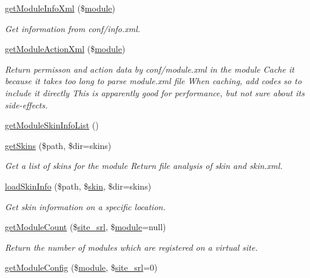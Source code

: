 \begin{DoxyCompactItemize}
\hyperlink{classmoduleModel_ae4e9287674bddc605dfc4cef77f8c1bb}{get\+Module\+Info\+Xml} (\$\hyperlink{classmodule}{module})
\begin{DoxyCompactList}\small\item\em Get information from conf/info.\+xml. \end{DoxyCompactList}\item 
\hyperlink{classmoduleModel_a2d53da77f2504357f99b93a2ad09981a}{get\+Module\+Action\+Xml} (\$\hyperlink{classmodule}{module})
\begin{DoxyCompactList}\small\item\em Return permisson and action data by conf/module.\+xml in the module Cache it because it takes too long to parse module.\+xml file When caching, add codes so to include it directly This is apparently good for performance, but not sure about its side-\/effects. \end{DoxyCompactList}\item 
\hyperlink{classmoduleModel_a9fae8e7a41eda8e384cb46d25430ae82}{get\+Module\+Skin\+Info\+List} ()
\item 
\hyperlink{classmoduleModel_abe2d53bb2e98a672c0a776537d7471cf}{get\+Skins} (\$path, \$dir=\textquotesingle{}skins\textquotesingle{})
\begin{DoxyCompactList}\small\item\em Get a list of skins for the module Return file analysis of skin and skin.\+xml. \end{DoxyCompactList}\item 
\hyperlink{classmoduleModel_a2b655921c58fd41c547b78481d585275}{load\+Skin\+Info} (\$path, \$\hyperlink{ko_8install_8php_ab0f2b49fdb57754496b34f6b880cdeaf}{skin}, \$dir=\textquotesingle{}skins\textquotesingle{})
\begin{DoxyCompactList}\small\item\em Get skin information on a specific location. \end{DoxyCompactList}\item 
\hyperlink{classmoduleModel_a2b22943c4d212c8284ef9780e0ebf3bd}{get\+Module\+Count} (\$\hyperlink{ko_8install_8php_a8b1406b4ad1048041558dce6bfe89004}{site\+\_\+srl}, \$\hyperlink{classmodule}{module}=null)
\begin{DoxyCompactList}\small\item\em Return the number of modules which are registered on a virtual site. \end{DoxyCompactList}\item 
\hyperlink{classmoduleModel_ae8005c8ab7ee3b9e6ddd7f71bb2b4698}{get\+Module\+Config} (\$\hyperlink{classmodule}{module}, \$\hyperlink{ko_8install_8php_a8b1406b4ad1048041558dce6bfe89004}{site\+\_\+srl}=0)

\end{DoxyCompactItemize}
